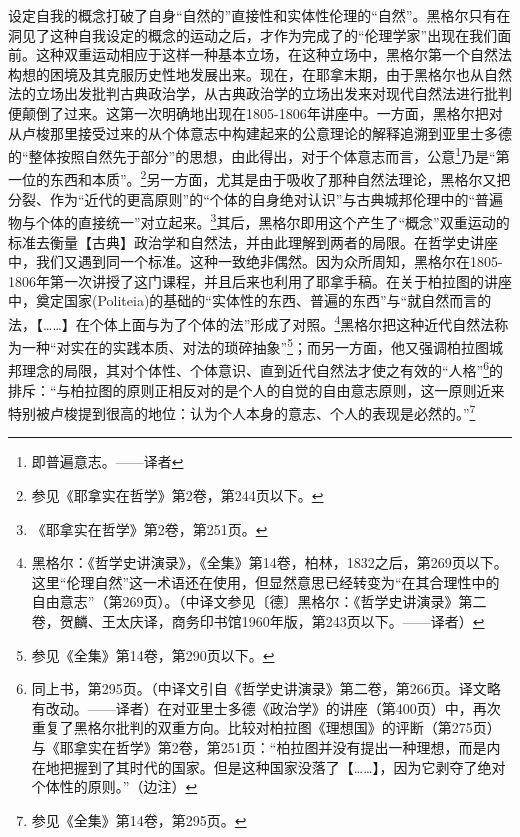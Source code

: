 设定自我的概念打破了自身“自然的”直接性和实体性伦理的“自然”。黑格尔只有在洞见了这种自我设定的概念的运动之后，才作为完成了的“伦理学家”出现在我们面前。这种双重运动相应于这样一种基本立场，在这种立场中，黑格尔第一个自然法构想的困境及其克服历史性地发展出来。现在，在耶拿末期，由于黑格尔也从自然法的立场出发批判古典政治学，从古典政治学的立场出发来对现代自然法进行批判便颠倒了过来。这第一次明确地出现在1805-1806年讲座中。一方面，黑格尔把对从卢梭那里接受过来的从个体意志中构建起来的公意理论的解释追溯到亚里士多德的“整体按照自然先于部分”的思想，由此得出，对于个体意志而言，公意\footnote{即普遍意志。——译者}乃是“第一位的东西和本质”。\footnote{参见《耶拿实在哲学》第2卷，第244页以下。}另一方面，尤其是由于吸收了那种自然法理论，黑格尔又把分裂、作为“近代的更高原则”的“个体的自身绝对认识”与古典城邦伦理中的“普遍物与个体的直接统一”对立起来。\footnote{《耶拿实在哲学》第2卷，第251页。}其后，黑格尔即用这个产生了“概念”双重运动的标准去衡量【古典】政治学和自然法，并由此理解到两者的局限。在哲学史讲座中，我们又遇到同一个标准。这种一致绝非偶然。因为众所周知，黑格尔在1805-1806年第一次讲授了这门课程，并且后来也利用了耶拿手稿。在关于柏拉图的讲座中，奠定国家(Politeia)的基础的“实体性的东西、普遍的东西”与“就自然而言的法，【……】在个体上面与为了个体的法”形成了对照。\footnote{黑格尔：《哲学史讲演录》，《全集》第14卷，柏林，1832之后，第269页以下。这里“伦理自然”这一术语还在使用，但显然意思已经转变为“在其合理性中的自由意志”（第269页）。（中译文参见〔德〕黑格尔：《哲学史讲演录》第二卷，贺麟、王太庆译，商务印书馆1960年版，第243页以下。——译者）}黑格尔把这种近代自然法称为一种“对实在的实践本质、对法的琐碎抽象”\footnote{参见《全集》第14卷，第290页以下。}；而另一方面，他又强调柏拉图城邦理念的局限，其对个体性、个体意识、直到近代自然法才使之有效的“人格”\footnote{同上书，第295页。（中译文引自《哲学史讲演录》第二卷，第266页。译文略有改动。——译者）在对亚里士多德《政治学》的讲座（第400页）中，再次重复了黑格尔批判的双重方向。比较对柏拉图《理想国》的评断（第275页）与《耶拿实在哲学》第2卷，第251页：“柏拉图并没有提出一种理想，而是内在地把握到了其时代的国家。但是这种国家没落了【……】，因为它剥夺了绝对个体性的原则。”（边注）}的排斥：“与柏拉图的原则正相反对的是个人的自觉的自由意志原则，这一原则近来特别被卢梭提到很高的地位：认为个人本身的意志、个人的表现是必然的。”\footnote{参见《全集》第14卷，第295页。}


